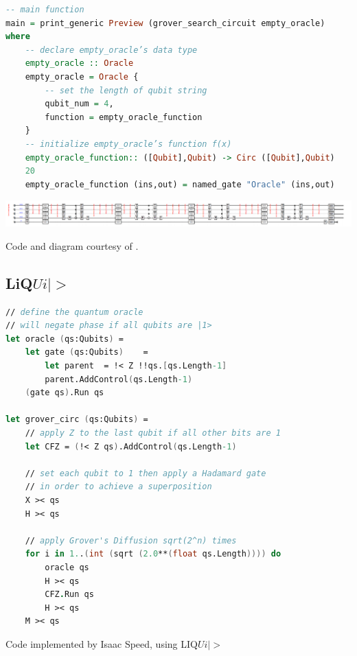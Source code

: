 \documentclass[]{article}
\begin{document}
\begin{lstlisting}[language=Haskell]
-- main function
main = print_generic Preview (grover_search_circuit empty_oracle)
where
	-- declare empty_oracle’s data type
	empty_oracle :: Oracle
	empty_oracle = Oracle {
		-- set the length of qubit string
		qubit_num = 4,
		function = empty_oracle_function
	}
	-- initialize empty_oracle’s function f(x)
	empty_oracle_function:: ([Qubit],Qubit) -> Circ ([Qubit],Qubit)
	20
	empty_oracle_function (ins,out) = named_gate "Oracle" (ins,out)
\end{lstlisting}
\includegraphics[width=0.9\linewidth]{quipper_grover}

{\small Code and diagram courtesy of \cite{quipper2}.}

\subsection{LiQ$Ui|>$}
\begin{lstlisting}[language=Fsharp]
// define the quantum oracle
// will negate phase if all qubits are |1>
let oracle (qs:Qubits) =
	let gate (qs:Qubits)    =
		let parent  = !< Z !!qs.[qs.Length-1]
		parent.AddControl(qs.Length-1)
	(gate qs).Run qs

let grover_circ (qs:Qubits) =
	// apply Z to the last qubit if all other bits are 1
	let CFZ = (!< Z qs).AddControl(qs.Length-1)

	// set each qubit to 1 then apply a Hadamard gate
	// in order to achieve a superposition
	X >< qs
	H >< qs
	
	// apply Grover's Diffusion sqrt(2^n) times
	for i in 1..(int (sqrt (2.0**(float qs.Length)))) do
		oracle qs
		H >< qs
		CFZ.Run qs
		H >< qs
	M >< qs
\end{lstlisting}
{\small Code implemented by Isaac Speed, using LIQ$Ui|>$ \cite{liquid1}}
\end{document}
